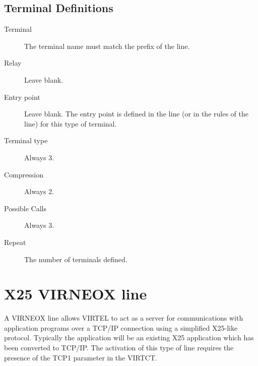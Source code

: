 \documentclass[letterpaper,10pt,english]{sphinxmanual}
\begin{document}


\subsection{Terminal Definitions}
\label{\detokenize{connectivity_guide:id25}}\label{\detokenize{connectivity_guide:index-57}}\begin{description}
\item[{Terminal}] \leavevmode
The terminal name must match the prefix of the line.

\item[{Relay}] \leavevmode
Leave blank.

\item[{Entry point}] \leavevmode
Leave blank. The entry point is defined in the line (or in the rules
of the line) for this type of terminal.

\item[{Terminal type}] \leavevmode
Always 3.

\item[{Compression}] \leavevmode
Always 2.

\item[{Possible Calls}] \leavevmode
Always 3.

\item[{Repeat}] \leavevmode
The number of terminals defined.

\end{description}

\newpage


\section{X25 VIRNEOX line}
\label{\detokenize{connectivity_guide:x25-virneox-line}}\label{\detokenize{connectivity_guide:index-58}}
A VIRNEOX line allows VIRTEL to act as a server for communications with application programs over a TCP/IP connection using a simplified X25-like protocol. Typically the application will be an  existing X25 application which has been converted to TCP/IP. The activation of this type of line requires the presence of the TCP1 parameter in the VIRTCT.


\end{document}
